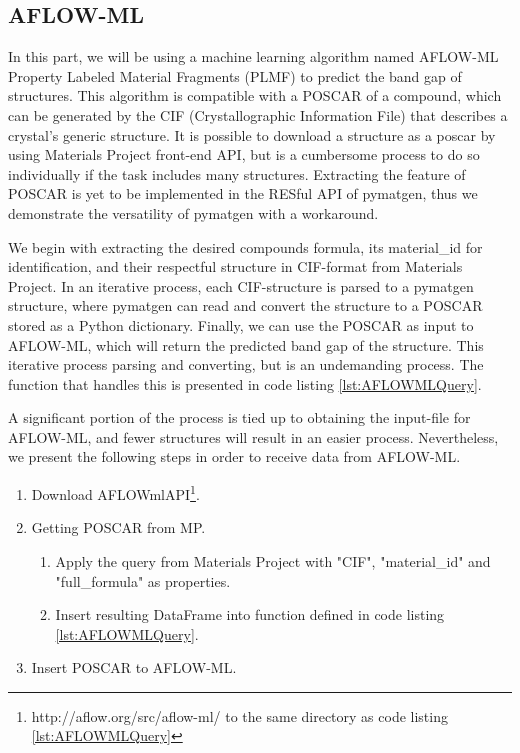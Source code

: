 

\subsection{AFLOW-ML}

In this part, we will be using a machine learning algorithm named AFLOW-ML Property Labeled Material Fragments (PLMF) \cite{Isayev2017} to predict the band gap of structures. This algorithm is compatible with a POSCAR of a compound, which can be generated by the CIF (Crystallographic Information File) that describes a crystal's generic structure. It is possible to download a structure as a poscar by using Materials Project front-end API, but is a cumbersome process to do so individually if the task includes many structures. Extracting the feature of POSCAR is yet to be implemented in the RESful API of pymatgen, thus we demonstrate the versatility of pymatgen with a workaround.

We begin with extracting the desired compounds formula, its material\_id for identification, and their respectful structure in CIF-format from Materials Project. In an iterative process, each CIF-structure is parsed to a pymatgen structure, where pymatgen can read and convert the structure to a POSCAR stored as a Python dictionary. Finally, we can use the POSCAR as input to AFLOW-ML, which will return the predicted band gap of the structure. This iterative process parsing and converting, but is an undemanding process. The function that handles this is presented in code listing \ref{lst:AFLOWMLQuery}.

A significant portion of the process is tied up to obtaining the input-file for AFLOW-ML, and fewer structures will result in an easier process. Nevertheless, we present the following steps in order to receive data from AFLOW-ML.

\begin{enumerate}
  \item Download AFLOWmlAPI\footnote{http://aflow.org/src/aflow-ml/ to the same directory as code listing \ref{lst:AFLOWMLQuery}}.
  \item Getting POSCAR from MP.
  \begin{enumerate}
    \item Apply the query from Materials Project with "CIF", "material\_id" and "full\_formula" as properties.
    \item Insert resulting DataFrame into function defined in code listing \ref{lst:AFLOWMLQuery}.
  \end{enumerate}
    \item Insert POSCAR to AFLOW-ML.
\end{enumerate}

